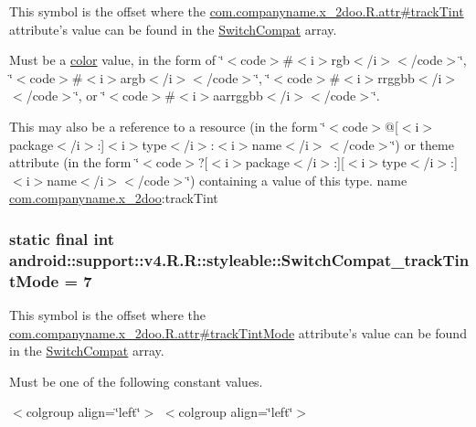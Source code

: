 This symbol is the offset where the \hyperlink{classcom_1_1companyname_1_1x__2doo_1_1_r_1_1attr_4e09abbece43caf8fd5e77207b47d7f1}{com.companyname.x\_\-2doo.R.attr\#trackTint} attribute's value can be found in the \hyperlink{classandroid_1_1support_1_1v4_1_1_r_1_1styleable_276d9c1ec80821a3e0fcdaa41daa75a0}{SwitchCompat} array.

Must be a \hyperlink{classandroid_1_1support_1_1v4_1_1_r_1_1color}{color} value, in the form of \char`\"{}$<$code$>$\#$<$i$>$rgb$<$/i$>$$<$/code$>$\char`\"{}, \char`\"{}$<$code$>$\#$<$i$>$argb$<$/i$>$$<$/code$>$\char`\"{}, \char`\"{}$<$code$>$\#$<$i$>$rrggbb$<$/i$>$$<$/code$>$\char`\"{}, or \char`\"{}$<$code$>$\#$<$i$>$aarrggbb$<$/i$>$$<$/code$>$\char`\"{}. 

This may also be a reference to a resource (in the form \char`\"{}$<$code$>$@\mbox{[}$<$i$>$package$<$/i$>$:\mbox{]}$<$i$>$type$<$/i$>$:$<$i$>$name$<$/i$>$$<$/code$>$\char`\"{}) or theme attribute (in the form \char`\"{}$<$code$>$?\mbox{[}$<$i$>$package$<$/i$>$:\mbox{]}\mbox{[}$<$i$>$type$<$/i$>$:\mbox{]}$<$i$>$name$<$/i$>$$<$/code$>$\char`\"{}) containing a value of this type.  name \hyperlink{namespacecom_1_1companyname_1_1x__2doo}{com.companyname.x\_\-2doo}:trackTint \hypertarget{classandroid_1_1support_1_1v4_1_1_r_1_1styleable_dd018911d038be332e08eef22a606e52}{
\subsubsection[{SwitchCompat\_\-trackTintMode}]{\setlength{\rightskip}{0pt plus 5cm}static final int android::support::v4.R.R::styleable::SwitchCompat\_\-trackTintMode = 7}}
\label{classandroid_1_1support_1_1v4_1_1_r_1_1styleable_dd018911d038be332e08eef22a606e52}


This symbol is the offset where the \hyperlink{classcom_1_1companyname_1_1x__2doo_1_1_r_1_1attr_7a4dd405e28b37f253244028762d079f}{com.companyname.x\_\-2doo.R.attr\#trackTintMode} attribute's value can be found in the \hyperlink{classandroid_1_1support_1_1v4_1_1_r_1_1styleable_276d9c1ec80821a3e0fcdaa41daa75a0}{SwitchCompat} array.

Must be one of the following constant values. \begin{TabularC}{0}
\hline
\end{TabularC}
$<$colgroup align=\char`\"{}left\char`\"{}$>$ $<$colgroup align=\char`\"{}left\char`\"{}$>$ 

